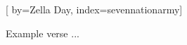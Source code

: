 
[%
    by={Zella Day},
    index={sevennationarmy}]


    \label{sevennationarmy}

    \beginverse
        Example verse ...
    \endverse
\endsong
